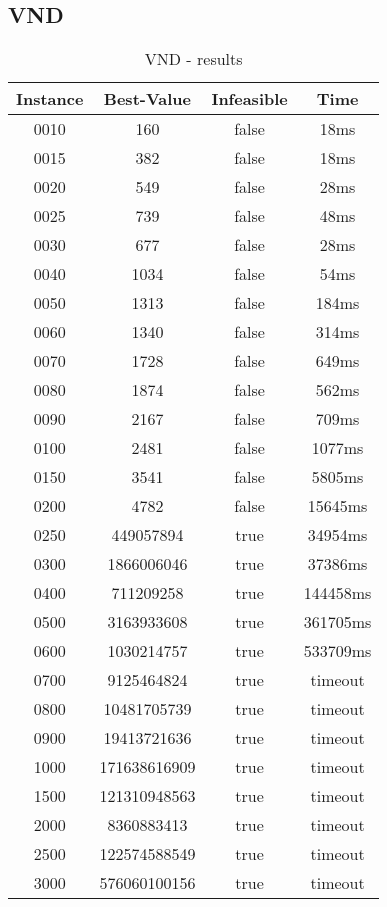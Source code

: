  \subsection*{VND}
\begin{table}[H]
	\centering
	\begin{tabular}{|| c | c | c | c ||} 
		\hline
		Instance & Best-Value & Infeasible & Time \\
		\hline\hline
		0010 & 160 & false & 18ms \\
		0015 & 382 & false & 18ms \\
		0020 & 549 & false & 28ms \\
		0025 & 739 & false & 48ms \\
		0030 & 677 & false & 28ms \\
		0040 & 1034 & false & 54ms \\
		0050 & 1313 & false & 184ms \\
		0060 & 1340 & false & 314ms \\
		0070 & 1728 & false & 649ms \\
		0080 & 1874 & false & 562ms \\
		0090 & 2167 & false & 709ms \\
		0100 & 2481 & false & 1077ms \\
		0150 & 3541 & false & 5805ms \\
		0200 & 4782 & false & 15645ms \\
		0250 & 449057894 & true & 34954ms \\
		0300 & 1866006046 & true & 37386ms \\
		0400 & 711209258 & true & 144458ms \\
		0500 & 3163933608 & true & 361705ms \\
		0600 & 1030214757 & true & 533709ms \\
		0700 & 9125464824 & true & timeout \\
		0800 & 10481705739 & true & timeout \\
		0900 & 19413721636 & true & timeout \\
		1000 & 171638616909 & true & timeout \\
		1500 & 121310948563 & true & timeout \\
		2000 & 8360883413 & true & timeout \\
		2500 & 122574588549 & true & timeout \\
		3000 & 576060100156 & true & timeout \\
		\hline
	\end{tabular}
	\caption{VND - results}
\end{table}


